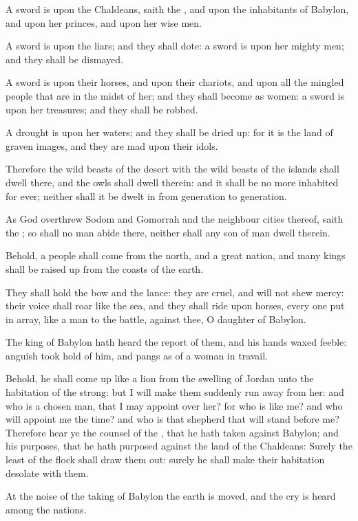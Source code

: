 \verse A sword is upon the Chaldeans, saith the \LORD, and upon the inhabitants of Babylon, and upon her princes, and upon her wise men.

\verse A sword is upon the liars; and they shall dote: a sword is upon her mighty men; and they shall be dismayed.

\verse A sword is upon their horses, and upon their chariots, and upon all the mingled people that are in the midst of her; and they shall become as women: a sword is upon her treasures; and they shall be robbed.

\verse A drought is upon her waters; and they shall be dried up: for it is the land of graven images, and they are mad upon their idols.

\verse Therefore the wild beasts of the desert with the wild beasts of the islands shall dwell there, and the owls shall dwell therein: and it shall be no more inhabited for ever; neither shall it be dwelt in from generation to generation.

\verse As God overthrew Sodom and Gomorrah and the neighbour cities thereof, saith the \LORD; so shall no man abide there, neither shall any son of man dwell therein.

\verse Behold, a people shall come from the north, and a great nation, and many kings shall be raised up from the coasts of the earth.

\verse They shall hold the bow and the lance: they are cruel, and will not shew mercy: their voice shall roar like the sea, and they shall ride upon horses, every one put in array, like a man to the battle, against thee, O daughter of Babylon.

\verse The king of Babylon hath heard the report of them, and his hands waxed feeble: anguish took hold of him, and pangs as of a woman in travail.

\verse Behold, he shall come up like a lion from the swelling of Jordan unto the habitation of the strong: but I will make them suddenly run away from her: and who is a chosen man, that I may appoint over her?  for who is like me? and who will appoint me the time? and who is that shepherd that will stand before me?  \verse Therefore hear ye the counsel of the \LORD, that he hath taken against Babylon; and his purposes, that he hath purposed against the land of the Chaldeans: Surely the least of the flock shall draw them out: surely he shall make their habitation desolate with them.

\verse At the noise of the taking of Babylon the earth is moved, and the cry is heard among the nations.


